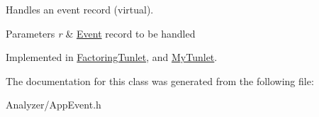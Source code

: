 Handles an event record (virtual). 


\begin{DoxyParams}{Parameters}
{\em r} & \hyperlink{class_model_1_1_event}{Event} record to be handled \\
\hline
\end{DoxyParams}


Implemented in \hyperlink{class_factoring_tunlet_aeb954297fd00f2801c807ef3ae2384f1}{Factoring\-Tunlet}, and \hyperlink{class_my_tunlet_af1b66922cbdce93415ef288ca36b3106}{My\-Tunlet}.



The documentation for this class was generated from the following file\-:\begin{DoxyCompactItemize}
\item 
Analyzer/App\-Event.\-h\end{DoxyCompactItemize}
